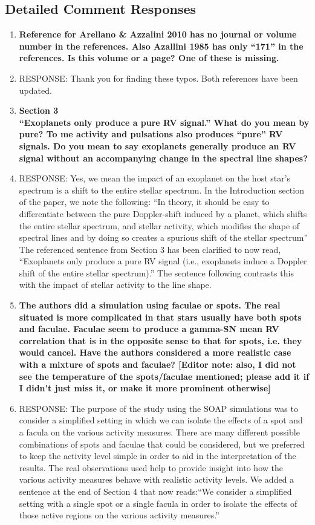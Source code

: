 \documentclass[11pt]{article}   	%
\begin{document}
\bigskip


\subsection{Detailed Comment Responses}

\begin{enumerate}
\item {\bf Reference for Arellano \& Azzalini 2010 has no journal or volume number in the references. Also Azallini 1985 has only ``171'' in the references. Is this volume or a page? One of these is missing.}
%
\item[]  RESPONSE:  Thank you for finding these typos.  Both references have been updated.
\bigskip
%
%
\item {\bf Section 3 \\
``Exoplanets only produce a pure RV signal.'' What do you mean by pure? To me activity and pulsations also produces ``pure'' RV signals. Do you mean to say exoplanets generally produce an RV signal without an accompanying change in the spectral line shapes?}
%
\item[]  RESPONSE:  Yes, we mean the impact of an exoplanet on the host star's spectrum is a shift to the entire stellar spectrum.  In the Introduction section of the paper, we note the following:  ``In theory, it should be easy to differentiate between the pure Doppler-shift induced by a planet, which shifts the entire stellar spectrum, and stellar activity, which modifies the shape of spectral lines and by doing so creates a spurious shift of the stellar spectrum''  The referenced sentence from Section 3 has been clarified to now read, ``Exoplanets only produce a pure RV signal (i.e., exoplanets induce a Doppler shift of the entire stellar spectrum).''  The sentence following contrasts this with the impact of stellar activity to the line shape.
\bigskip
%
%
\item {\bf The authors did a simulation using faculae or spots. The real situated is more complicated in that stars usually have both spots and faculae. Faculae seem to produce a gamma-SN mean RV correlation that is in the opposite sense to that for spots, i.e. they would cancel. Have the authors considered a more realistic case with a mixture of spots and faculae? [Editor note: also, I did not see the temperature of the spots/faculae mentioned; please add it if I didn't just miss it, or make it more prominent otherwise]}
%
\item[]  RESPONSE:  The purpose of the study using the SOAP simulations was to consider a simplified setting in which we can isolate the effects of a spot and a facula on the various activity measures.  There are many different possible combinations of spots and faculae that could be considered, but we preferred to keep the activity level simple in order to aid in the interpretation of the results.  The real observations used help to provide insight into how the various activity measures behave with realistic activity levels. We added a sentence at the end of Section 4 that now reads:``We consider a simplified setting with a single spot or a single facula in order to isolate the effects of those active regions on the various activity measures.''


\end{enumerate}
\end{document}
